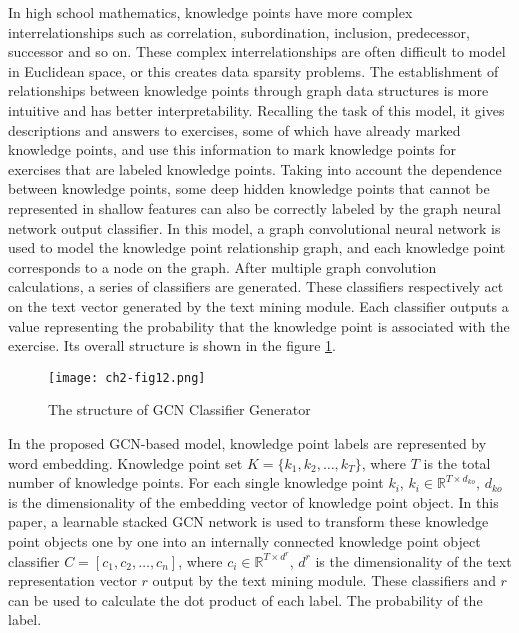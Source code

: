 In high school mathematics, knowledge points have more complex interrelationships such as correlation, subordination, inclusion, predecessor, successor and so on. These complex interrelationships are often difficult to model in Euclidean space, or this creates data sparsity problems. The establishment of relationships between knowledge points through graph data structures is more intuitive and has better interpretability. Recalling the task of this model, it gives descriptions and answers to exercises, some of which have already marked knowledge points, and use this information to mark knowledge points for exercises that are labeled knowledge points. Taking into account the dependence between knowledge points, some deep hidden knowledge points that cannot be represented in shallow features can also be correctly labeled by the graph neural network output classifier. In this model, a graph convolutional neural network is used to model the knowledge point relationship graph, and each knowledge point corresponds to a node on the graph. After multiple graph convolution calculations, a series of classifiers are generated. These classifiers respectively act on the text vector generated by the text mining module. Each classifier outputs a value representing the probability that the knowledge point is associated with the exercise. Its overall structure is shown in the figure \ref{fig:ch2-fig12}.

\begin{figure}[h]
	\centering
	\texttt{[image: ch2-fig12.png]}
	\caption{The structure of GCN Classifier Generator}
	\label{fig:ch2-fig12}
\end{figure}

In the proposed GCN-based model, knowledge point labels are represented by word embedding. Knowledge point set \(K=\{k_1,k_2,\ldots,k_T\} \), where \(T\) is the total number of knowledge points. For each single knowledge point \(k_i\), \(k_i \in \mathbb{R}^{T\times d_{ko}}\), \(d_{ko}\) is the dimensionality of the embedding vector of knowledge point object. In this paper, a learnable stacked GCN network is used to transform these knowledge point objects one by one into an internally connected knowledge point object classifier \(C=[c_1,c_2,\ldots,c_n]\), where \(c_i\in\mathbb {R}^{T\times d^r}\), \(d^r\) is the dimensionality of the text representation vector \(r\) output by the text mining module. These classifiers and \(r\) can be used to calculate the dot product of each label. The probability of the label.

